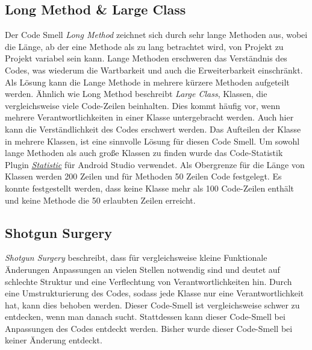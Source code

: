 \subsection{Long Method \& Large Class}

Der Code Smell \textit{Long Method} zeichnet sich durch sehr lange Methoden aus, wobei die Länge, ab der eine Methode als zu lang betrachtet wird, von Projekt zu Projekt variabel sein kann.
Lange Methoden erschweren das Verständnis des Codes, was wiederum die Wartbarkeit und auch die Erweiterbarkeit einschränkt. 
Als Lösung kann die Lange Methode in mehrere kürzere Methoden aufgeteilt werden.
\newline
\newline
Ähnlich wie Long Method beschreibt \textit{Large Class}, Klassen, die vergleichsweise viele Code-Zeilen beinhalten.
Dies kommt häufig vor, wenn mehrere Verantwortlichkeiten in einer Klasse untergebracht werden. Auch hier kann die Verständlichkeit des Codes erschwert werden.
Das Aufteilen der Klasse in mehrere Klassen, ist eine sinnvolle Lösung für diesen Code Smell.
\newline
\newline
Um sowohl lange Methoden als auch große Klassen zu finden wurde das Code-Statistik Plugin \href{https://plugins.jetbrains.com/plugin/4509-statistic}{\textit{Statistic}} für Android Studio verwendet.
Als Obergrenze für die Länge von Klassen werden 200 Zeilen und für Methoden 50 Zeilen Code festgelegt. Es konnte festgestellt werden, dass keine Klasse mehr als 100 Code-Zeilen enthält und keine Methode die 50 erlaubten Zeilen erreicht.

\subsection{Shotgun Surgery}

\textit{Shotgun Surgery} beschreibt, dass für vergleichsweise kleine Funktionale Änderungen Anpassungen an vielen Stellen notwendig sind und deutet auf schlechte Struktur und eine Verflechtung von Verantwortlichkeiten hin.
Durch eine Umstrukturierung des Codes, sodass jede Klasse nur eine Verantwortlichkeit hat, kann dies behoben werden.
\newline
\newline
Dieser Code-Smell ist vergleichsweise schwer zu entdecken, wenn man danach sucht. Stattdessen kann dieser Code-Smell bei Anpassungen des Codes entdeckt werden.
Bisher wurde dieser Code-Smell bei keiner Änderung entdeckt.

